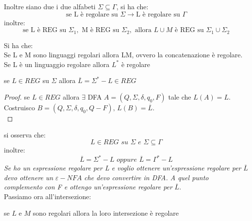 Inoltre siano due i due alfabeti $\Sigma\subseteq\Gamma$, si ha che:
$$\mbox{se L è regolare su }\Sigma\to \mbox{L è regolare su }\Gamma$$
inoltre:
$$\mbox{se L è REG su }\Sigma_1, \mbox{ M è REG su }\Sigma_2, \mbox{ allora } L\cup M \mbox{ è REG su }\Sigma_1\cup\Sigma_2$$
\begin{theorem}
	Si ha che:\\
	Se L e M sono linguaggi regolari allora LM, ovvero la concatenazione è regolare.\\
	Se L è un linguaggio regolare allora $L^*$ è regolare
\end{theorem}
\begin{theorem}
	se $L\in REG$ su $\Sigma$ allora $\overline{L}=\Sigma^*-L\in REG$
\end{theorem}
\begin{proof}
	se $L\in REG$ allora $\exists$ DFA $A=(Q, \Sigma, \delta, q_0, F)$ tale che $L(A)=L$. Costruisco $B=(Q,\Sigma, \delta,q_0, Q-F),\,	 L(B)=\overline{L}$.\\
\end{proof}
si osserva che:
$$L\in REG\,\,su\,\, \Sigma\,\,e\,\, \Sigma\subseteq \Gamma$$
inoltre:
$$\overline{L}=\Sigma^*-L\,\,oppure\,\, \overline{L}=\Gamma^*-L$$
\textit{Se ho un espressione regolare per L e voglio ottenere un'espressione regolare per }$\overline{L}$\textit{ devo ottenere un }$\varepsilon-NFA$\textit{ che devo convertire in DFA. A quel punto complemento con F e ottengo un'espressione regolare per }$\overline{L}$.\\
Passiamo ora all'intersezione:
\begin{theorem}
	se $L$ e $M$ sono regolari allora la loro intersezione è regolare
\end{theorem}
